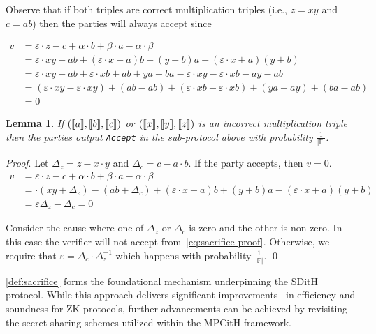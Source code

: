 \documentclass[11pt]{report}
\theoremstyle{definition}
\theoremstyle{plain}
\newtheorem{lemma}{Lemma}[section]
\begin{document}
Observe that if both triples are correct multiplication triples (i.e., $z = xy$ and $c = ab$) then the parties will always accept since

\begin{align*}
  v & = \varepsilon \cdot z - c + \alpha \cdot b + \beta \cdot a - \alpha \cdot \beta                                                     \\
    & = \varepsilon \cdot xy - ab + (\varepsilon \cdot x + a)b + (y + b)a - (\varepsilon \cdot x + a)(y + b)                              \\
    & = \varepsilon \cdot xy - ab + \varepsilon \cdot xb + ab + ya + ba - \varepsilon \cdot xy - \varepsilon \cdot xb - ay - ab           \\
    & = (\varepsilon \cdot xy - \varepsilon \cdot xy) + (ab - ab) + (\varepsilon \cdot xb - \varepsilon \cdot xb) + (ya - ay) + (ba - ab) \\
    & = 0
\end{align*}

\begin{lemma}\label{lem:sacrifice_soundness}
  If $(\llbracket a \rrbracket, \llbracket b \rrbracket, \llbracket c \rrbracket)$ or $(\llbracket x \rrbracket, \llbracket y \rrbracket, \llbracket z \rrbracket)$ is an incorrect multiplication triple then the parties output \texttt{Accept} in the sub-protocol above with probability $\frac{1}{|\mathbb{F}|}$.
\end{lemma}

\textit{Proof}. Let $\Delta_z = z - x \cdot y$ and $\Delta_c = c - a \cdot b$. If the party accepts, then $v = 0$.
\begin{align}
  v & = \varepsilon \cdot z - c + \alpha \cdot b + \beta \cdot a - \alpha \cdot \beta                           \nonumber             \\
    & = \cdot (xy + \Delta_z ) - (ab + \Delta_c) + (\varepsilon \cdot x + a)b + (y + b)a - (\varepsilon \cdot x + a)(y + b) \nonumber \\
    & = \varepsilon\Delta_z - \Delta_c = 0 \label{eq:sacrifice-proof}
\end{align}

Consider the cause where one of $\Delta_z$ or $\Delta_c$ is zero and the other is non-zero. In this case the verifier will not accept from~\ref{eq:sacrifice-proof}. Otherwise, we require that $\varepsilon = \Delta_c \cdot \Delta_z^{-1}$ which happens with probability $\frac{1}{|\mathbb{F}|}$. \qed

\autoref{def:sacrifice} forms the foundational mechanism underpinning the SDitH protocol. While this approach delivers significant improvements~\cite{baum2020concretely,feneuil2022syndrome} in efficiency and soundness for ZK protocols, further advancements can be achieved by revisiting the secret sharing schemes utilized within the MPCitH framework.
\end{document}
